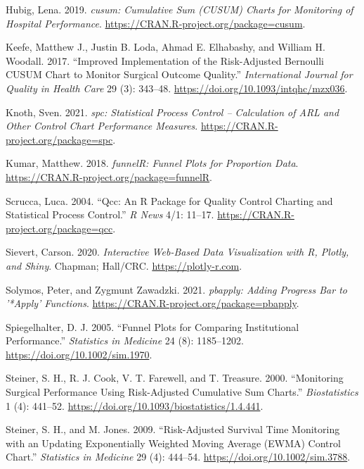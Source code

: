 \begin{CSLReferences}{1}{0}
\leavevmode{}%
Hubig, Lena. 2019. \emph{{cusum}: Cumulative Sum (CUSUM) Charts for Monitoring of Hospital Performance}. \url{https://CRAN.R-project.org/package=cusum}.

\leavevmode{}%
Keefe, Matthew J., Justin B. Loda, Ahmad E. Elhabashy, and William H. Woodall. 2017. {``Improved Implementation of the Risk-Adjusted Bernoulli CUSUM Chart to Monitor Surgical Outcome Quality.''} \emph{International Journal for Quality in Health Care} 29 (3): 343--48. \url{https://doi.org/10.1093/intqhc/mzx036}.

\leavevmode{}%
Knoth, Sven. 2021. \emph{{spc}: Statistical Process Control -- Calculation of ARL and Other Control Chart Performance Measures}. \url{https://CRAN.R-project.org/package=spc}.

\leavevmode{}%
Kumar, Matthew. 2018. \emph{funnelR: Funnel Plots for Proportion Data}. \url{https://CRAN.R-project.org/package=funnelR}.

\leavevmode{}%
Scrucca, Luca. 2004. {``Qcc: An {R} Package for Quality Control Charting and Statistical Process Control.''} \emph{R News} 4/1: 11--17. \url{https://CRAN.R-project.org/package=qcc}.

\leavevmode{}%
Sievert, Carson. 2020. \emph{Interactive Web-Based Data Visualization with {R}, Plotly, and Shiny}. Chapman; Hall/CRC. \url{https://plotly-r.com}.

\leavevmode{}%
Solymos, Peter, and Zygmunt Zawadzki. 2021. \emph{{pbapply}: Adding Progress Bar to '*Apply' Functions}. \url{https://CRAN.R-project.org/package=pbapply}.

\leavevmode{}%
Spiegelhalter, D. J. 2005. {``Funnel Plots for Comparing Institutional Performance.''} \emph{Statistics in Medicine} 24 (8): 1185--1202. \url{https://doi.org/10.1002/sim.1970}.

\leavevmode{}%
Steiner, S. H., R. J. Cook, V. T. Farewell, and T. Treasure. 2000. {``Monitoring Surgical Performance Using Risk-Adjusted Cumulative Sum Charts.''} \emph{Biostatistics} 1 (4): 441--52. \url{https://doi.org/10.1093/biostatistics/1.4.441}.

\leavevmode{}%
Steiner, S. H., and M. Jones. 2009. {``Risk-Adjusted Survival Time Monitoring with an Updating Exponentially Weighted Moving Average {(EWMA)} Control Chart.''} \emph{Statistics in Medicine} 29 (4): 444--54. \url{https://doi.org/10.1002/sim.3788}.


\end{CSLReferences}
